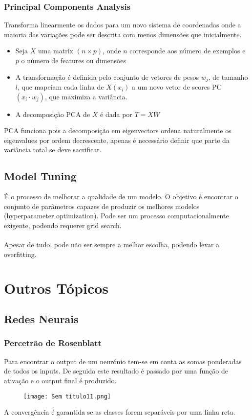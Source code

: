 \documentclass[10pt,a4paper]{report}
\begin{document}
\subsection{Principal Components Analysis}
Transforma linearmente os dados para um novo sistema de coordenadas onde a maioria das variações pode ser descrita com menos dimensões que inicialmente.
\begin{itemize}
\item Seja $X$ uma matrix $(n \times p)$, onde $n$ corresponde aos número de exemplos e  $p$ o número de features ou dimensões
\item A transformação é definida pelo conjunto de vetores de pesos $w_j$, de tamanho $l$, que mapeiam cada linha de $X(x_i)$ a um novo vetor de scores PC $(x_i \cdot w_j)$, que maximiza a variância.
\item A decomposição PCA de $X$ é dada por $T = XW$
\end{itemize}
PCA funciona pois a decomposição em eigenvectors ordena naturalmente os eigenvalues por ordem decrescente, apenas é necessário definir que parte da variância total se deve sacrificar.
\section{Model Tuning}
É o processo de melhorar a qualidade de um modelo. O objetivo é encontrar o conjunto de parâmetros capazes de produzir os melhores modelos (hyperparameter optimization). Pode ser um processo computacionalmente exigente, podendo requerer grid search.\\
\\
Apesar de tudo, pode não ser sempre a melhor escolha, podendo levar a overfitting.

\chapter{Outros Tópicos}
\section{Redes Neurais}
\subsection{Percetrão de Rosenblatt}
Para encontrar o output de um neurónio tem-se em conta as somas ponderadas de todos os inputs. De seguida este resultado é passado por uma função de ativação e o output final é produzido.
\begin{figure}[H]
\centering
\texttt{[image: Sem título11.png]}
\end{figure}
A convergência é garantida se as classes forem separáveis por uma linha reta.
\end{document}

